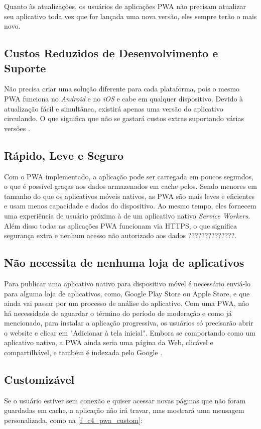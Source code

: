 Quanto às atualizações, os usuários de aplicações \ac{PWA} não precisam atualizar seu aplicativo toda vez que for lançada uma nova versão, eles sempre terão o mais novo.

\subsection{Custos Reduzidos de Desenvolvimento e Suporte}
Não precisa criar uma solução diferente para cada plataforma, pois o mesmo \ac{PWA} funciona no \textit{Android} e no \textit{iOS} e cabe em qualquer dispositivo. Devido à atualização fácil e simultânea, existirá apenas uma versão do aplicativo circulando. O que significa que não se gastará custos extras suportando várias versões \cite{pwabenefits}.

\subsection{Rápido, Leve e Seguro}
Com o \ac{PWA} implementado, a aplicação pode ser carregada em poucos segundos, o que é possível graças aos dados armazenados em cache pelos. Sendo menores em tamanho do que os aplicativos móveis nativos, as \ac{PWA} são mais leves e eficientes e usam menos capacidade e dados do dispositivo. Ao mesmo tempo, eles fornecem uma experiência de usuário próxima à de um aplicativo nativo \textit{Service Workers}. Além disso todas as aplicações \ac{PWA} funcionam via HTTPS, o que significa segurança extra e nenhum acesso não autorizado aos dados \cite{pwa2} ??????????????.

\subsection{Não necessita de nenhuma loja de aplicativos}
Para publicar uma aplicativo nativo para dispositivo móvel é necessário enviá-lo para alguma loja de aplicativos, como, Google Play Store ou Apple Store, e que ainda vai passar por um processo de análise do aplicativo. Com uma \ac{PWA}, não há necessidade de aguardar o término do período de moderação e como já mencionado, para instalar a aplicação progressiva, os usuários só precisarão abrir o website e clicar em "Adicionar à tela inicial". Embora se comportando como um aplicativo nativo, a \ac{PWA} ainda seria uma página da Web, clicável e compartilhável, e também é indexada pelo Google \cite{pwabenefits}.

\subsection{Customizável}
Se o usuário estiver sem conexão e quiser acessar novas páginas que não foram guardadas em cache, a aplicação não irá travar, mas mostrará uma mensagem personalizada, como na \autoref{f_c4_pwa_custom}:

